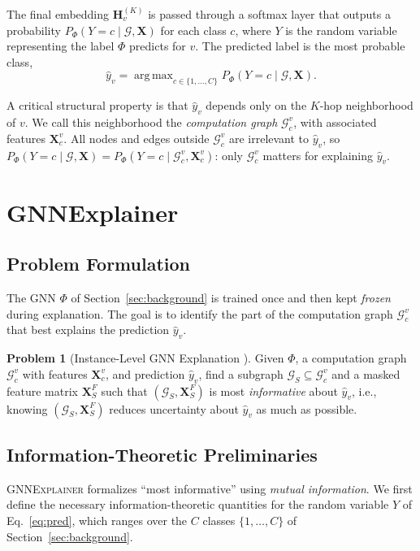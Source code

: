 \documentclass{article}
\newcommand{\GNNEx}{\textsc{GNNExplainer}\xspace}
\newcommand{\calG}{\mathcal{G}}
\newcommand{\bfX}{\mathbf{X}}
\newcommand{\bfH}{\mathbf{H}}
\DeclareMathOperator*{\argmax}{arg\,max}
\theoremstyle{definition}
\newtheorem{problem}{Problem}
\begin{document}
The final embedding $\bfH_v^{(K)}$ is passed through a softmax layer that
outputs a probability $P_\Phi(Y\!=\!c \mid \calG, \bfX)$ for each class $c$,
where $Y$ is the random variable representing the label $\Phi$ predicts for
$v$. The predicted label is the most probable class,
\begin{equation}
  \hat{y}_v = \argmax_{c \in \{1,\dots,C\}} P_\Phi(Y\!=\!c \mid \calG, \bfX).
  \label{eq:pred}
\end{equation}

A critical structural property is that $\hat{y}_v$ depends only on the
$K$-hop neighborhood of $v$. We call this neighborhood the
\emph{computation graph} $\calG_c^v$, with associated features $\bfX_c^v$.
All nodes and edges outside $\calG_c^v$ are irrelevant to $\hat{y}_v$, so
$P_\Phi(Y\!=\!c \mid \calG, \bfX) = P_\Phi(Y\!=\!c \mid \calG_c^v, \bfX_c^v)$:
only $\calG_c^v$ matters for explaining $\hat{y}_v$.


\section{GNNExplainer}
\label{sec:method}

\subsection{Problem Formulation}

The GNN $\Phi$ of Section~\ref{sec:background} is trained once and then kept
\emph{frozen} during explanation. The goal is to identify the part of the
computation graph $\calG_c^v$ that best explains the prediction $\hat{y}_v$.

\begin{problem}[Instance-Level GNN Explanation \citep{ying2019gnnexplainer}]
Given $\Phi$, a computation graph $\calG_c^v$ with features $\bfX_c^v$, and
prediction $\hat{y}_v$, find a subgraph $\calG_S \subseteq \calG_c^v$ and a
masked feature matrix $\bfX_S^F$ such that $(\calG_S, \bfX_S^F)$ is most
\emph{informative} about $\hat{y}_v$, i.e., knowing $(\calG_S, \bfX_S^F)$
reduces uncertainty about $\hat{y}_v$ as much as possible.
\end{problem}

\subsection{Information-Theoretic Preliminaries}

\GNNEx formalizes ``most informative'' using \emph{mutual information}. We
first define the necessary information-theoretic quantities for the random
variable $Y$ of Eq.~\eqref{eq:pred}, which ranges over the $C$ classes
$\{1,\dots,C\}$ of Section~\ref{sec:background}.
\end{document}
